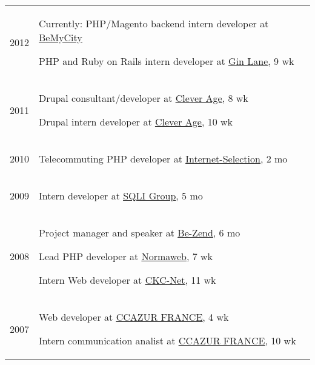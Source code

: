 \documentclass[letterpaper]{article}
\renewenvironment{itemize}{
    \begin{list}{}{
        \setlength{\leftmargin}{1.5em}
    }
}{
    \end{list}
}
\begin{document}
        \setlength{\tabcolsep}{0.6cm}
        \begin{tabular}{p{1cm}p{\textwidth}}
            \large{2012} & \begin{itemize}
                \item Currently: PHP/Magento backend intern developer at \uline{\href{http://www.bemycity.com}{BeMyCity}}
                \item PHP and Ruby on Rails intern developer at \uline{\href{http://www.ginlanemedia.com}{Gin Lane}}, 9 wk
            \end{itemize} \\
            \large{2011} & \begin{itemize}
                \item Drupal consultant/developer at \uline{\href{http://www.cleverage.com}{Clever Age}}, 8 wk
                \item Drupal intern developer at \uline{\href{http://www.cleverage.com}{Clever Age}}, 10 wk
            \end{itemize} \\
            \large{2010} &  \begin{itemize}
                \item Telecommuting PHP developer at \uline{\href{http://www.internet-selection.net}{Internet-Selection}}, 2 mo
            \end{itemize} \\
            \large{2009} &  \begin{itemize}
                \item Intern developer at \uline{\href{http://www.sqli.com}{SQLI Group}}, 5 mo
            \end{itemize} \\
            \large{2008} &  \begin{itemize}
                \item Project manager and speaker at \uline{\href{htt://www.be-zend.org}{Be-Zend}}, 6 mo
                \item Lead PHP developer at \uline{\href{http://www.normaweb.fr}{Normaweb}}, 7 wk
                \item Intern Web developer at \uline{\href{http://www.ckc-net.com}{CKC-Net}}, 11 wk
            \end{itemize} \\
            \large{2007} &  \begin{itemize}
                \item Web developer at \uline{\href{http://www.ccazur.com}{CCAZUR FRANCE}}, 4 wk
                \item Intern communication analist at \uline{\href{http://www.ccazur.com}{CCAZUR FRANCE}}, 10 wk
            \end{itemize}
        \end{tabular}
        
\end{document}
